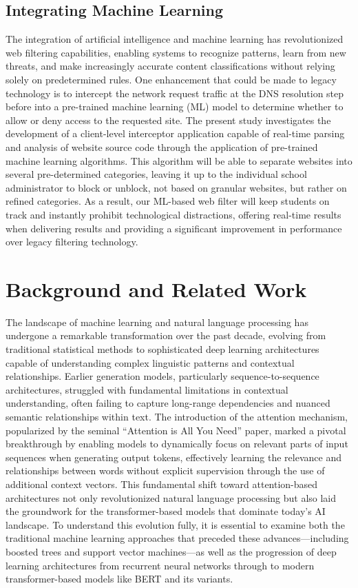 \documentclass[
  titlepage]{article}
\begin{document}
\subsection{Integrating Machine
Learning}\label{integrating-machine-learning}

The integration of artificial intelligence and machine learning has
revolutionized web filtering capabilities, enabling systems to recognize
patterns, learn from new threats, and make increasingly accurate content
classifications without relying solely on predetermined rules. One
enhancement that could be made to legacy technology is to intercept the
network request traffic at the DNS resolution step before into a
pre-trained machine learning (ML) model to determine whether to allow or
deny access to the requested site. The present study investigates the
development of a client-level interceptor application capable of
real-time parsing and analysis of website source code through the
application of pre-trained machine learning algorithms. This algorithm
will be able to separate websites into several pre-determined
categories, leaving it up to the individual school administrator to
block or unblock, not based on granular websites, but rather on refined
categories. As a result, our ML-based web filter will keep students on
track and instantly prohibit technological distractions, offering
real-time results when delivering results and providing a significant
improvement in performance over legacy filtering technology.

\section{Background and Related Work}\label{background-and-related-work}

The landscape of machine learning and natural language processing has
undergone a remarkable transformation over the past decade, evolving
from traditional statistical methods to sophisticated deep learning
architectures capable of understanding complex linguistic patterns and
contextual relationships. Earlier generation models, particularly
sequence-to-sequence architectures, struggled with fundamental
limitations in contextual understanding, often failing to capture
long-range dependencies and nuanced semantic relationships within text.
The introduction of the attention mechanism, popularized by the seminal
``Attention is All You Need'' paper, marked a pivotal breakthrough by
enabling models to dynamically focus on relevant parts of input
sequences when generating output tokens, effectively learning the
relevance and relationships between words without explicit supervision
through the use of additional context vectors. This fundamental shift
toward attention-based architectures not only revolutionized natural
language processing but also laid the groundwork for the
transformer-based models that dominate today's AI landscape. To
understand this evolution fully, it is essential to examine both the
traditional machine learning approaches that preceded these
advances---including boosted trees and support vector machines---as well
as the progression of deep learning architectures from recurrent neural
networks through to modern transformer-based models like BERT and its
variants.
\end{document}
